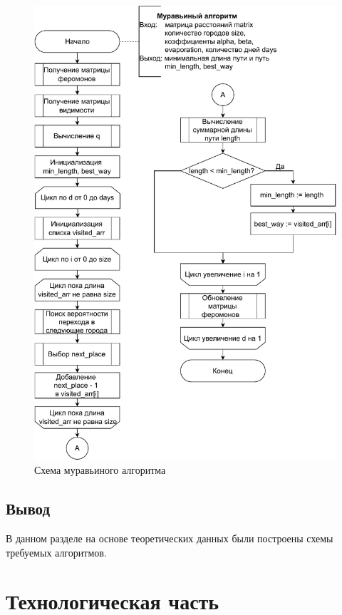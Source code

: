 \documentclass[a4paper,14pt, unknownkeysallowed]{extreport}
\begin{document}
\begin{figure}[h!]
	\centering
	\includegraphics[width=1\linewidth]{img/ant_alg.pdf}
	\caption{Схема муравьиного алгоритма}
	\label{fig:ant_alg}
\end{figure}

\clearpage

\section*{Вывод}
	
В данном разделе на основе теоретических данных были построены схемы требуемых алгоритмов.
	
\chapter{Технологическая часть}
	
\end{document}
